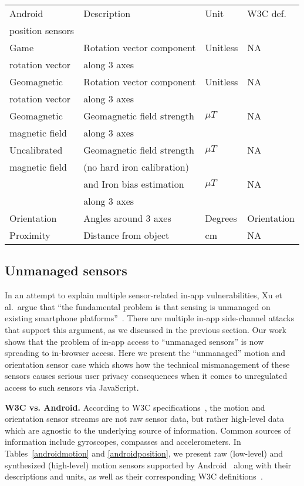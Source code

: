 \documentclass[10pt,twocolumn]{article}
\begin{document}
\begin{table*}[t]
\centering
\begin{tabular}{|l|l|l|l|}
\hline
Android & Description &  Unit & W3C def.\\
position sensors &&&\\
\hline
Game  & Rotation vector component & Unitless & NA\\
rotation vector & along 3 axes&&\\
\hline
Geomagnetic  & Rotation vector component& Unitless & NA\\
rotation vector&  along 3 axes&&\\
\hline
Geomagnetic  & Geomagnetic field strength & $\mu T$ & NA\\
magnetic field& along 3 axes&&\\
\hline
Uncalibrated & Geomagnetic field strength & $\mu T$ & NA\\
magnetic field & (no hard iron calibration)&&\\
\hline
& and Iron bias estimation & $\mu T$ & NA\\
&along 3 axes&&\\
\hline
Orientation & Angles around 3 axes& Degrees & Orientation\\
\hline
Proximity & Distance from object & cm & NA\\
\hline
\end{tabular}
\caption{Position sensors supported by Android and their corresponding W3C definitions. Note: Orientation sensor was deprecated in Android~2.2 (API Level~8).}
\label{androidposition}
\end{table*}
\subsection{Unmanaged sensors}
In an attempt to explain multiple sensor-related in-app vulnerabilities, Xu et al.\ argue that ``the fundamental problem is that sensing is unmanaged on existing smartphone platforms''~\cite{taplogger}. 
There are multiple in-app side-channel attacks that support this argument, as we discussed in the previous section. 
Our work shows that the problem of in-app access to ``unmanaged sensors'' is now spreading to in-browser access. 
Here we present the ``unmanaged'' motion and orientation sensor case which shows how the technical mismanagement of these sensors causes serious user privacy consequences when it comes to unregulated access to such sensors via JavaScript. 

\textbf{W3C vs. Android.} 
According to W3C specifications~\cite{W3CMotion}, the motion and orientation sensor streams are not raw sensor data, but rather high-level data which are agnostic to the underlying source of information. Common sources of information include gyroscopes, compasses and accelerometers. In Tables~\ref{androidmotion} and \ref{androidposition}, we present 
raw (low-level) and synthesized (high-level) 
motion sensors supported by Android~\cite{AndDev} along with their descriptions and units, as well as their corresponding W3C definitions~\cite{W3CMotion}. 
\end{document}
